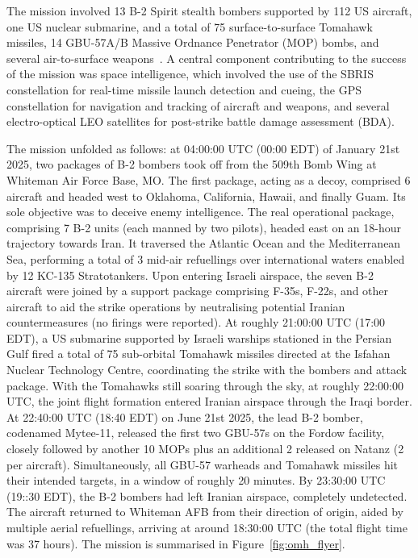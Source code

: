 \documentclass{article}
\begin{document}
The mission involved 13 B-2 Spirit stealth bombers supported by 112 US aircraft, one US nuclear submarine, and a total of 75 surface-to-surface Tomahawk missiles, 14 GBU-57A/B Massive Ordnance Penetrator (MOP) bombs, and several air-to-surface weapons~\cite{lemay2025midnight}. A central component contributing to the success of the mission was space intelligence, which involved the use of the SBRIS constellation for real-time missile launch detection and cueing, the GPS constellation for navigation and tracking of aircraft and weapons, and several electro-optical LEO satellites for post-strike battle damage assessment (BDA). 

The mission unfolded as follows: at 04:00:00 UTC (00:00 EDT) of January 21st 2025, two packages of B-2 bombers took off from the 509th Bomb Wing at Whiteman Air Force Base, MO. The first package, acting as a decoy, comprised 6 aircraft and headed west to Oklahoma, California, Hawaii, and finally Guam. Its sole objective was to deceive enemy intelligence. The real operational package, comprising 7 B-2 units (each manned by two pilots), headed east on an 18-hour trajectory towards Iran. It traversed the Atlantic Ocean and the Mediterranean Sea, performing a total of 3 mid-air refuellings over international waters enabled by 12 KC-135 Stratotankers. Upon entering Israeli airspace, the seven B-2 aircraft were joined by a support package comprising F-35s, F-22s, and other aircraft to aid the strike operations by neutralising potential Iranian countermeasures (no firings were reported). At roughly 21:00:00 UTC (17:00 EDT), a US submarine supported by Israeli warships stationed in the Persian Gulf fired a total of 75 sub-orbital Tomahawk missiles directed at the Isfahan Nuclear Technology Centre, coordinating the strike with the bombers and attack package. With the Tomahawks still soaring through the sky, at roughly 22:00:00 UTC, the joint flight formation entered Iranian airspace through the Iraqi border. At 22:40:00 UTC (18:40 EDT) on June 21st 2025, the lead B-2 bomber, codenamed Mytee-11, released the first two GBU-57s on the Fordow facility, closely followed by another 10 MOPs plus an additional 2 released on Natanz (2 per aircraft). Simultaneously, all GBU-57 warheads and Tomahawk missiles hit their intended targets, in a window of roughly 20 minutes. By 23:30:00 UTC (19::30 EDT), the B-2 bombers had left Iranian airspace, completely undetected. The aircraft returned to Whiteman AFB from their direction of origin, aided by multiple aerial refuellings, arriving at around 18:30:00 UTC (the total flight time was 37 hours). The mission is summarised in Figure~\ref{fig:omh_flyer}.
\end{document}
